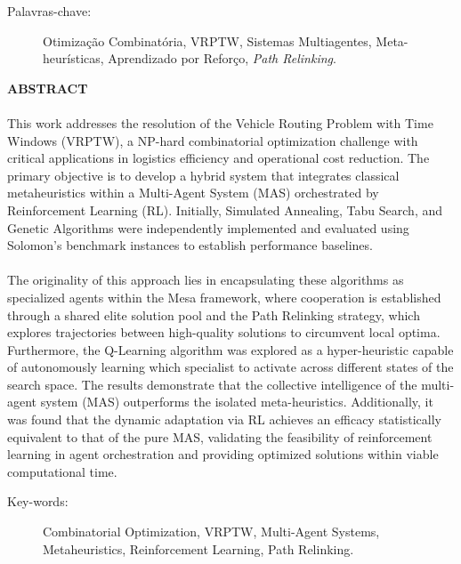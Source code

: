 \begin{description}
    \item[Palavras-chave:]  Otimização Combinatória, VRPTW, Sistemas Multiagentes, Meta-heurísticas, Aprendizado por Reforço, \textit{Path Relinking}.
\end{description}

\pagebreak


\begin{center}
\textbf{ABSTRACT}
\end{center}
      \vspace{0.5cm}

\paragraph{}This work addresses the resolution of the Vehicle Routing Problem with Time Windows (VRPTW), a NP-hard combinatorial optimization challenge with critical applications in logistics efficiency and operational cost reduction. The primary objective is to develop a hybrid system that integrates classical metaheuristics within a Multi-Agent System (MAS) orchestrated by Reinforcement Learning (RL). Initially, Simulated Annealing, Tabu Search, and Genetic Algorithms were independently implemented and evaluated using Solomon’s benchmark instances to establish performance baselines.

\paragraph{}The originality of this approach lies in encapsulating these algorithms as specialized agents within the Mesa framework, where cooperation is established through a shared elite solution pool and the Path Relinking strategy, which explores trajectories between high-quality solutions to circumvent local optima. Furthermore, the Q-Learning algorithm was explored as a hyper-heuristic capable of autonomously learning which specialist to activate across different states of the search space. The results demonstrate that the collective intelligence of the multi-agent system (MAS) outperforms the isolated meta-heuristics. Additionally, it was found that the dynamic adaptation via RL achieves an efficacy statistically equivalent to that of the pure MAS, validating the feasibility of reinforcement learning in agent orchestration and providing optimized solutions within viable computational time.


\begin{description}
    \item[Key-words:] Combinatorial Optimization, VRPTW, Multi-Agent Systems, Metaheuristics, Reinforcement Learning, Path Relinking.
\end{description}


